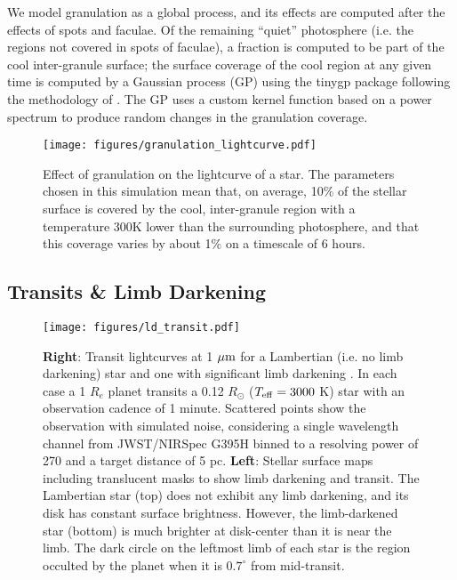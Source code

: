 \documentclass[twocolumn]{aastex631}
\begin{document}
We model granulation as a global process, and its effects are computed after the effects of spots and faculae. Of the remaining ``quiet'' photosphere (i.e. the regions not covered in spots of faculae), a fraction is computed to be part of the cool
inter-granule surface; the surface coverage of the cool region at any given time is computed by a Gaussian process (GP) using the {\sc tinygp} package \citep{foreman-mackey2024} following the methodology of \citet{gordon2020}. The GP uses a custom kernel function based on a power spectrum \citep{anderson1990,kallinger2014} to produce random changes in the granulation coverage.

\begin{figure}
    \centering
    \texttt{[image: figures/granulation\_lightcurve.pdf]}
    \caption{
        Effect of granulation on the lightcurve of a star. The parameters chosen in this simulation mean that, on average, 10\% of the stellar surface is covered by the cool, inter-granule region with a temperature 300K lower than the surrounding photosphere, and that this coverage varies by about 1\% on a timescale of 6 hours.
        }
    \label{fig:gran_lc}
\end{figure}

\subsection{Transits \& Limb Darkening}

\begin{figure*}
    \centering
    \texttt{[image: figures/ld\_transit.pdf]}
    \caption{
        {\bf Right}: Transit lightcurves at 1 ${\rm \mu m}$ for a Lambertian (i.e. no limb darkening) star and one with significant limb darkening \citep[$u_1=0.5,\,u_2=0.15$,][]{espinoza2015}. In each case a 1 $R_e$ planet transits a 0.12 $R_\odot$ ($T_{\rm eff} = 3000$ K) star with an observation cadence of 1 minute. Scattered points show the observation with simulated noise, considering a single wavelength channel from JWST/NIRSpec G395H binned to a resolving power of 270 and a target distance of 5 pc.
        {\bf Left}: Stellar surface maps including translucent masks to show limb darkening and transit. The Lambertian star (top) does not exhibit any limb darkening, and its disk has constant surface brightness. However, the limb-darkened star (bottom) is much brighter at disk-center than it is near the limb. The dark circle on the leftmost limb of each star is the region occulted by the planet when it is $0.7^\circ$ from mid-transit.
    }
    \label{fig:ld_transit}
\end{figure*}
\end{document}
